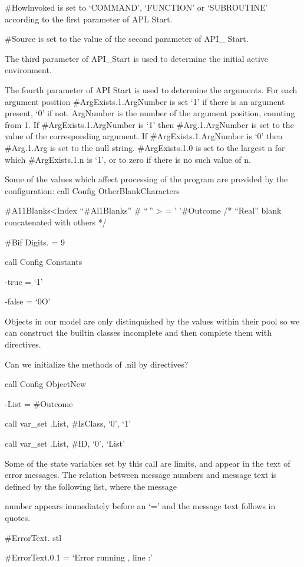 \#Howlnvoked is set to `COMMAND', `FUNCTION' or `SUBROUTINE' according
to the first parameter of APL Start.

\#Source is set to the value of the second parameter of API\_ Start.

The third parameter of API\_Start is used to determine the initial
active environment.

The fourth parameter of API Start is used to determine the arguments.
For each argument position \#ArgExists.1.ArgNumber is set `1' if there
is an argument present, `0' if not. ArgNumber is the number of the
argument position, counting from 1. If \#ArgExists.1.ArgNumber is `1'
then \#Arg.1.ArgNumber is set to the value of the corresponding
argument. If \#ArgExists.1.ArgNumber is `0' then \#Arg.1.Arg is set to
the null string. \#ArgExists.1.0 is set to the largest n for which
\#ArgExists.1.n is `1', or to zero if there is no such value of n.

Some of the values which affect processing of the program are provided
by the configuration: call Config OtherBlankCharacters

\#A11Blanks\textless Index ``\#Al1Blanks'' \# ``\,'' \textgreater{} = '
'\#Outcome /* ``Real'' blank concatenated with others */

\#Bif Digits. = 9

call Config Constants

-true = `1'

-false = `0O'

Objects in our model are only distinquished by the values within their
pool so we can construct the builtin classes incomplete and then
complete them with directives.

Can we initialize the methods of .nil by directives?

call Config ObjectNew

-List = \#Outcome

call var\_set .List, \#IsClass, `0', `1'

call var\_set .List, \#ID, `0', `List'

Some of the state variables set by this call are limits, and appear in
the text of error messages. The relation between message numbers and
message text is defined by the following list, where the message

number appears immediately before an `=' and the message text follows in
quotes.

\#ErrorText. stl

\#ErrorText.0.1 = `Error running , line :'

